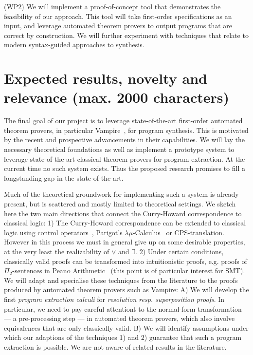 \documentclass[a4paper,12pt]{article}
\begin{document}
(WP2) We will implement a proof-of-concept tool that demonstrates the feasibility of our approach.
This tool will take first-order specifications as an input, and leverage automated theorem provers to output programs that are correct by construction.
We will further experiment with techniques that relate to modern syntax-guided approaches to synthesis.


\section{Expected results, novelty and relevance (max. 2000 characters)}

The final goal of our project is to leverage state-of-the-art first-order automated theorem provers, in particular Vampire~\cite{conf/cav/KovacsV13}, for program synthesis.
This is motivated by the recent and prospective advancements in their capabilities.
We will lay the necessary theoretical foundations as well as implement a prototype system to leverage state-of-the-art classical theorem provers for program extraction.
At the current time no such system exists.
Thus the proposed research promises to fill a longstanding gap in the state-of-the-art.

Much of the theoretical groundwork for implementing such a system is already present,
but is scattered and mostly limited to theoretical settings.
We sketch here the two main directions that connect the Curry-Howard correspondence to classical logic:
1) The Curry-Howard correspondence can be extended to classical logic using control operators~\cite{Control1}, Parigot's $\lambda\mu$-Calculus~\cite{Parigot1} or CPS-translation.
However in this process we must in general give up on some desirable properties, at the very least the realizability of $\vee$ and $\exists$.
2) Under certain conditions, classically valid proofs can be transformed into intuitionistic proofs, e.g. proofs of $\Pi_2$-sentences in Peano Arithmetic~\cite{HAPA} (this point is of particular interest for SMT).
We will adapt and specialise these techniques from the literature to the proofs produced by automated theorem provers such as Vampire:
A) We will develop the first\emph{ program extraction calculi} for \emph{resolution resp. superposition proofs}.
In particular, we need to pay careful attentiont to the normal-form transformation --- a pre-processing step --- in automated theorem provers, which also involve equivalences that are only classically valid.
B) We will identify assumptions under which our adaptions of the techniques 1) and 2) guarantee that such a program extraction is possible.
We are not aware of related results in the literature.
\end{document}
